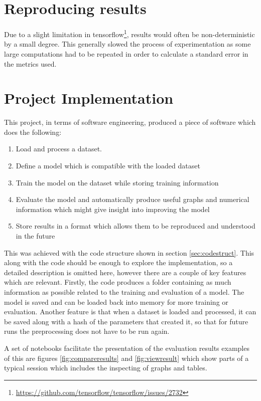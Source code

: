   \section{Reproducing results} \label{sec:GPU}
    Due to a slight limitation in tensorflow\footnote{\url{https://github.com/tensorflow/tensorflow/issues/2732}}, results would often be non-deterministic by a small degree. This generally slowed
    the process of experimentation as some large computations had to be repeated in order to calculate a standard error in the metrics used.
  \section{Project Implementation}
    This project, in terms of software engineering, produced a piece of software which does the following:
    \begin{enumerate}
      \item Load and process a dataset.
      \item Define a model which is compatible with the loaded dataset
      \item Train the model on the dataset while storing training information
      \item Evaluate the model and automatically produce useful graphs and numerical information which might give insight into improving the model
      \item Store results in a format which allows them to be reproduced and understood in the future
    \end{enumerate}

    This was achieved with the code structure shown in section \ref{sec:codestruct}.
    This along with the code should be enough to explore the implementation, so a detailed
    description is omitted here, however there are a couple of key features which are
    relevant. Firstly, the code produces a folder containing as much information as possible
    related to the training and evaluation of a model. The model is saved and can be loaded back into
    memory for more training or evaluation. Another feature is that when a dataset is loaded and processed, it can be
    saved along with a hash of the parameters that created it, so that for future runs the preprocessing does not have to be run again.

    A set of notebooks facilitate the presentation of the evaluation results examples of this are figures \ref{fig:compareresults} and \ref{fig:viewresult} which show parts of a typical session which includes the inspecting of graphs and tables.

